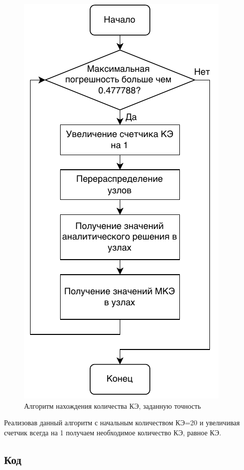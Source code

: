 \begin{figure}[H]
\centerline{\includegraphics[scale = 0.65]{labs/img/img2.pdf}}
\caption{Алгоритм нахождения количества КЭ, заданную точность}
\label{alg}
\end{figure}

Реализовав данный алгоритм с начальным количеством КЭ=20 и увеличивая счетчик всегда на 1 получаем необходимое количество КЭ, равное КЭ.

\subsection{Код}


